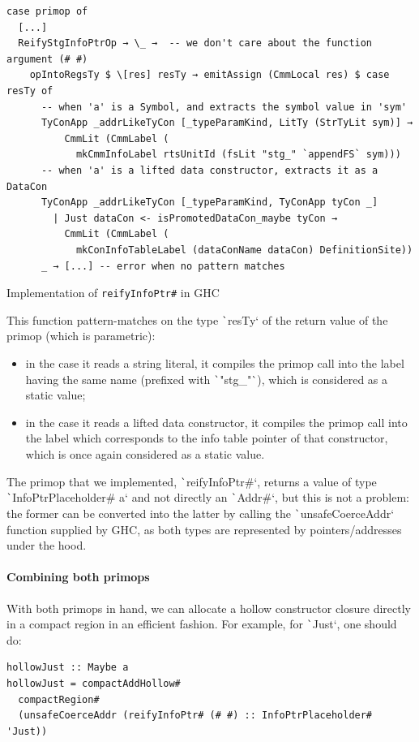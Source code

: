 \documentclass[english]{jflart}
\begin{document}
\begin{table}[t]
\small
\begin{verbatim}
case primop of
  [...]
  ReifyStgInfoPtrOp → \_ →  -- we don't care about the function argument (# #)
    opIntoRegsTy $ \[res] resTy → emitAssign (CmmLocal res) $ case resTy of
      -- when 'a' is a Symbol, and extracts the symbol value in 'sym'
      TyConApp _addrLikeTyCon [_typeParamKind, LitTy (StrTyLit sym)] →
          CmmLit (CmmLabel (
            mkCmmInfoLabel rtsUnitId (fsLit "stg_" `appendFS` sym)))
      -- when 'a' is a lifted data constructor, extracts it as a DataCon
      TyConApp _addrLikeTyCon [_typeParamKind, TyConApp tyCon _]
        | Just dataCon <- isPromotedDataCon_maybe tyCon →
          CmmLit (CmmLabel (
            mkConInfoTableLabel (dataConName dataCon) DefinitionSite))
      _ → [...] -- error when no pattern matches
\end{verbatim}
\caption{Implementation of \texttt{reifyInfoPtr\#} in GHC}
\label{table:impl-reifyInfoPtr}
\end{table}

This function pattern-matches on the type \texttt`resTy` of the return value of the primop (which is parametric):
\begin{itemize}
  \item in the case it reads a string literal, it compiles the primop call into the label having the same name (prefixed with \texttt`"stg_"`), which is considered as a static value;
  \item in the case it reads a lifted data constructor, it compiles the primop call into the label which corresponds to the info table pointer of that constructor, which is once again considered as a static value.
\end{itemize}

The primop that we implemented, \texttt`reifyInfoPtr#`, returns a value of type \texttt`InfoPtrPlaceholder# a` and not directly an \texttt`Addr#`, but this is not a problem: the former can be converted into the latter by calling the \texttt`unsafeCoerceAddr` function supplied by GHC, as both types are represented by pointers/addresses under the hood.

\paragraph{Combining both primops}

With both primops in hand, we can allocate a hollow constructor closure directly in a compact region in an efficient fashion. For example, for \texttt`Just`, one should do:
{\small
\begin{verbatim}
hollowJust :: Maybe a
hollowJust = compactAddHollow#
  compactRegion#
  (unsafeCoerceAddr (reifyInfoPtr# (# #) :: InfoPtrPlaceholder# 'Just))  
\end{verbatim}
}
\end{document}
